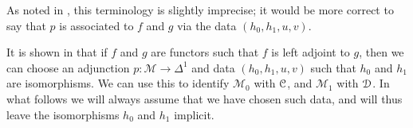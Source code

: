 \documentclass[main.tex]{subfiles}
\begin{document}
\begin{note}
  As noted in \cite{highertopostheory}, this terminology is slightly imprecise; it would be more correct to say that $p$ is associated to $f$ and $g$ via the data $(h_{0}, h_{1}, u, v)$.
\end{note}

\begin{note}
  It is shown in \cite{highertopostheory} that if $f$ and $g$ are functors such that $f$ is left adjoint to $g$, then we can choose an adjunction $p\colon \mathcal{M} \to \Delta^{1}$ and data $(h_{0}, h_{1}, u, v)$ such that $h_{0}$ and $h_{1}$ are isomorphisms. We can use this to identify $\mathcal{M}_{0}$ with $\mathcal{C}$, and $\mathcal{M}_{1}$ with $\mathcal{D}$. In what follows we will always assume that we have chosen such data, and will thus leave the isomorphisms $h_{0}$ and $h_{1}$ implicit.
\end{note}
\end{document}
